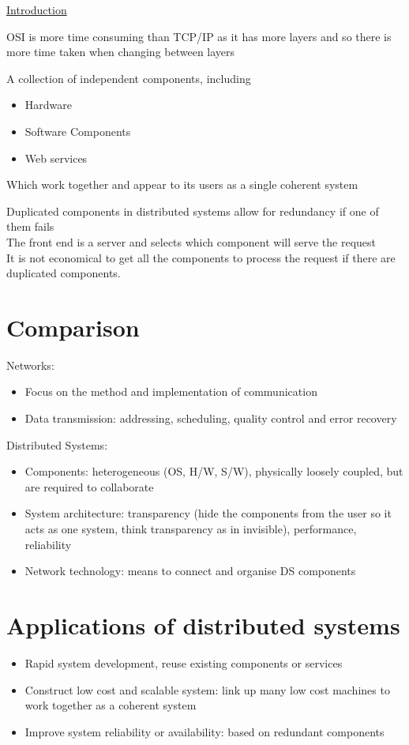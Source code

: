 \documentclass{article}[18pt]
\begin{document}
\begin{center}
\underline{\huge Introduction}
\end{center}
OSI is more time consuming than TCP/IP as it has more layers and so there is more time taken when changing between layers
\begin{defin}
	A collection of independent components, including
	\begin{itemize}
		\item Hardware
		\item Software Components
		\item Web services
	\end{itemize}
	Which work together and appear to its users as a single coherent system
\end{defin}
Duplicated components in distributed systems allow for redundancy if one of them fails\\
The front end is a server and selects which component will serve the request\\
It is not economical to get all the components to process the request if there are duplicated components.
\section{Comparison}
Networks:
\begin{itemize}
	\item Focus on the method and implementation of communication
	\item Data transmission: addressing, scheduling, quality control and error recovery
\end{itemize}
Distributed Systems:
\begin{itemize}
	\item Components: heterogeneous (OS, H/W, S/W), physically loosely coupled, but are required to collaborate
	\item System architecture: transparency (hide the components from the user so it acts as one system, think transparency as in invisible), performance, reliability
	\item Network technology: means to connect and organise DS components
\end{itemize}
\section{Applications of distributed systems}
\begin{itemize}
	\item Rapid system development, reuse existing components or services
	\item Construct low cost and scalable system: link up many low cost machines to work together as a coherent system
	\item Improve system reliability or availability: based on redundant components
\end{itemize}
\end{document}
